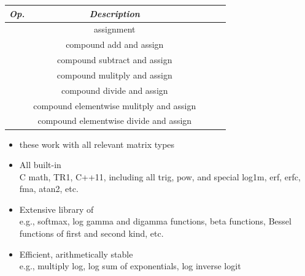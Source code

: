 \documentclass[10pt]{report}
\begin{document}
%
\vfill
\noindent\spc
{\footnotesize
  \begin{tabular}{c|ccl|l}
    {\it Op.} & {\it Description} \\ \hline \hline
    \code{=} & assignment \\
    \code{+=} & compound add and assign \\
    \code{-=} & compound subtract and assign \\
    \code{*=} & compound mulitply and assign \\
    \code{/=} & compound divide and assign \\
    \code{.*=} & compound elementwise mulitply and assign \\
    \code{./=} & compound elementwise divide and assign \\

  \end{tabular}
}
%
\begin{itemize}
\item these work with all relevant matrix types
\end{itemize}


%
\begin{itemize}
\item All built-in 
  \\
  {\footnotesize C math, TR1, C++11, including all trig, pow, and
    special log1m, erf, erfc, fma, atan2, etc.}
\item Extensive library of 
  \\
  {\footnotesize e.g., softmax,
    log gamma and digamma functions, beta functions, Bessel functions of
    first and second kind, etc.}
\item Efficient, arithmetically stable 
  \\
  {\footnotesize e.g., multiply log, log sum of
    exponentials, log inverse logit}
\end{itemize}
\end{document}
